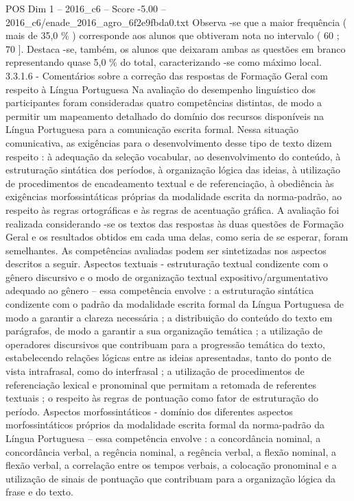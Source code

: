 \begin{textsample}{POS Dim 1 – 2016\_c6 – Score -5.00 – 2016\_c6/enade\_2016\_agro\_6f2e9fbda0.txt}
Observa -se que a maior frequência ( mais de 35,0 \% ) corresponde aos alunos que obtiveram nota no intervalo ( 60 ; 70 ].
Destaca -se, também, os alunos que deixaram ambas as questões em branco representando quase 5,0 \% do total, caracterizando -se como máximo local. 3.3.1.6 - Comentários sobre a correção das respostas de Formação Geral com respeito à Língua Portuguesa Na avaliação do desempenho linguístico dos participantes foram consideradas quatro competências distintas, de modo a permitir um mapeamento detalhado do domínio dos recursos disponíveis na Língua Portuguesa para a comunicação escrita formal.
Nessa situação comunicativa, as exigências para o desenvolvimento desse tipo de texto dizem respeito : à adequação da seleção vocabular, ao desenvolvimento do conteúdo, à estruturação sintática dos períodos, à organização lógica das ideias, à utilização de procedimentos de encadeamento textual e de referenciação, à obediência às exigências morfossintáticas próprias da modalidade escrita da norma-padrão, ao respeito às regras ortográficas e às regras de acentuação gráfica.
A avaliação foi realizada considerando -se os textos das respostas às duas questões de Formação Geral e os resultados obtidos em cada uma delas, como seria de se esperar, foram semelhantes.
As competências avaliadas podem ser sintetizadas nos aspectos descritos a seguir.
Aspectos textuais - estruturação textual condizente com o gênero discursivo e o modo de organização textual expositivo/argumentativo adequado ao gênero – essa competência envolve : a estruturação sintática condizente com o padrão da modalidade escrita formal da Língua Portuguesa de modo a garantir a clareza necessária ; a distribuição do conteúdo do texto em parágrafos, de modo a garantir a sua organização temática ; a utilização de operadores discursivos que contribuam para a progressão temática do texto, estabelecendo relações lógicas entre as ideias apresentadas, tanto do ponto de vista intrafrasal, como do interfrasal ; a utilização de procedimentos de referenciação lexical e pronominal que permitam a retomada de referentes textuais ; o respeito às regras de pontuação como fator de estruturação do período.
Aspectos morfossintáticos - domínio dos diferentes aspectos morfossintáticos próprios da modalidade escrita formal da norma-padrão da Língua Portuguesa – essa competência envolve : a concordância nominal, a concordância verbal, a regência nominal, a regência verbal, a flexão nominal, a flexão verbal, a correlação entre os tempos verbais, a colocação pronominal e a utilização de sinais de pontuação que contribuam para a organização lógica da frase e do texto.

\end{textsample}
